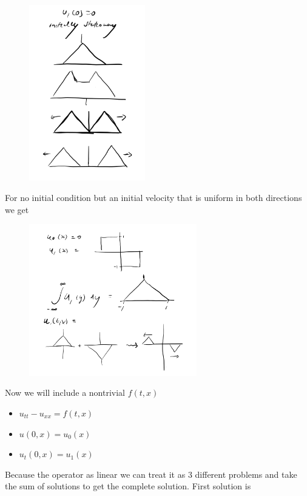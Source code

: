 \documentclass[11pt,a4paper]{article}
\begin{document}
\begin{figure}[H]
	\centering
	\includegraphics[width=0.45\textwidth]{waveevolution1.png} %
\end{figure}
For no initial condition but an initial velocity that is uniform in both directions we get
\begin{figure}[H]
	\centering
	\includegraphics[width=0.65\textwidth]{waveevolution2.png} %
\end{figure}
 Now we will include a nontrivial $f(t,x)$
\begin{itemize}
\item $u_{tt}-u_{xx} = f(t,x)$
\item $u(0,x) = u_{0}(x)$
\item$u_{t}(0,x) = u_{1}(x)$
\end{itemize}
Because the operator as linear we can treat it as 3 different problems and take the sum of solutions to get the complete solution. First solution is
\end{document}
